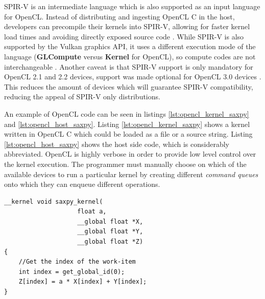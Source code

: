SPIR-V is an intermediate language which is also supported as an input language for OpenCL. Instead of distributing and ingesting OpenCL C in the host, developers can precompile their kernels into SPIR-V, allowing for faster kernel load times and avoiding directly exposed source code \cite{spir_overview}. While SPIR-V is also supported by the Vulkan \cite{vulkan} graphics API, it uses a different execution mode of the language (\textbf{GLCompute} versus \textbf{Kernel} for OpenCL), so compute codes are not interchangeable \cite{spir_spec}. Another caveat is that SPIR-V support is only mandatory for OpenCL 2.1 and 2.2 devices, support was made optional for OpenCL 3.0 devices \cite{opencl_spec}. This reduces the amount of devices which will guarantee SPIR-V compatibility, reducing the appeal of SPIR-V only distributions.

An example of OpenCL code can be seen in listings \ref{lst:opencl_kernel_saxpy} and \ref{lst:opencl_host_saxpy}. Listing \ref{lst:opencl_kernel_saxpy} shows a kernel written in OpenCL C which could be loaded as a file or a source string. Listing \ref{lst:opencl_host_saxpy} shows the host side code, which is considerably abbreviated. OpenCL is highly verbose in order to provide low level control over the kernel execution. The programmer must manually choose on which of the available devices to run a particular kernel by creating different \textit{command queues} onto which they can enqueue different operations. 

\begin{lstlisting}[style=CStyle, caption=OpenCL saxpy example (kernel), float, floatplacement=H, label={lst:opencl_kernel_saxpy}]
__kernel void saxpy_kernel(                
                    float a,             
                    __global float *X,       
                    __global float *Y,       
                    __global float *Z)       
{                                          
    //Get the index of the work-item       
    int index = get_global_id(0);          
    Z[index] = a * X[index] + Y[index]; 
}                                          
\end{lstlisting}

